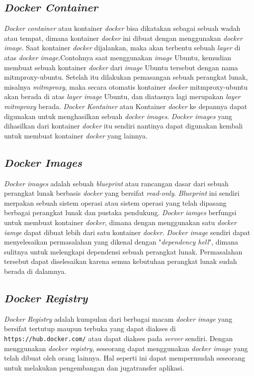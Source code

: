 	\subsection{\textit{Docker Container}}
	\textit{Docker container} atau kontainer \textit{docker} bisa dikatakan sebagai sebuah wadah atau tempat, dimana kontainer \textit{docker} ini dibuat dengan menggunakan \textit{docker image}. Saat kontainer \textit{docker} dijalankan, maka akan terbentu sebuah \textit{layer} di atas \textit{docker image}.Contohnya saat menggunakan \textit{image} Ubuntu, kemudian membuat sebuah kontainer \textit{docker} dari \textit{image} Ubuntu tersebut dengan nama mitmproxy-ubuntu. Setelah itu dilakukan pemasangan sebuah perangkat lunak, misalnya \textit{mitmproxy}, maka secara otomatis kontainer \textit{docker} mitmproxy-ubuntu akan berada di atas \textit{layer image} Ubuntu, dan diatasnya lagi merupakan \textit{layer mitmproxy} berada. \textit{Docker Kontainer} atau Kontainer \textit{docker} ke depannya dapat digunakan untuk menghasilkan sebuah \textit{docker images}. \textit{Docker images} yang dihasilkan dari kontainer \textit{docker} itu sendiri nantinya dapat digunakan kembali untuk membuat kontainer \textit{docker} yang lainnya.
	
	\subsection{\textit{Docker Images}}
	\textit{Docker images} adalah sebuah \textit{blueprint} atau rancangan dasar dari sebuah perangkat lunak berbasis \textit{docker} yang bersifat \textit{read-only}. \textit{Blueprint} ini sendiri merpakan sebuah sistem operasi atau sistem operasi yang telah dipasang berbagai perangkat lunak dan pustaka pendukung. \textit{Docker iamges} berfungsi untuk membuat kontainer \textit{docker}, dimana dengan menggunakan satu \textit{docker iamge} dapat dibuat lebih dari satu kontainer \textit{docker}. \textit{Docker image} sendiri dapat menyelesaikan permasalahan yang dikenal dengan "\textit{dependency hell}", dimana sulitnya untuk melengkapi dependensi sebuah perangkat lunak. Permasalahan tersebut dapat diselesaikan karena semua kebutuhan perangkat lunak sudah berada di dalamnya.
	
	\subsection{\textit{Docker Registry}}
	\textit{Docker Registry} adalah kumpulan dari berbagai macam \textit{docker image} yang bersifat tertutup maupun terbuka yang dapat diakses di \texttt{https://hub.docker.com/} atau dapat diakses pada \textit{server} sendiri. Dengan menggunakan \textit{docker registry}, seseorang dapat menggunakan \textit{docker image} yang telah dibuat oleh orang lainnya. Hal seperti ini dapat mempermudah seseorang untuk melakukan pengembangan dan jugatransfer aplikasi.
	